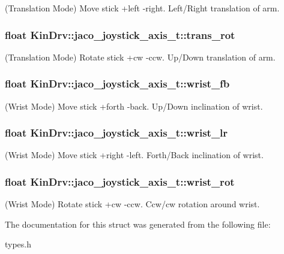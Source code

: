 (Translation Mode) Move stick +left -\/right. Left/\+Right translation of arm. \hypertarget{structKinDrv_1_1jaco__joystick__axis__t_a722bc8f21958cfe9152c105e1c15d7c8}{
\subsubsection[{trans\+\_\+rot}]{\setlength{\rightskip}{0pt plus 5cm}float Kin\+Drv\+::jaco\+\_\+joystick\+\_\+axis\+\_\+t\+::trans\+\_\+rot}}\label{structKinDrv_1_1jaco__joystick__axis__t_a722bc8f21958cfe9152c105e1c15d7c8}
(Translation Mode) Rotate stick +cw -\/ccw. Up/\+Down translation of arm. \hypertarget{structKinDrv_1_1jaco__joystick__axis__t_a7a2b4e7886b584225de0eebcb92451ed}{
\subsubsection[{wrist\+\_\+fb}]{\setlength{\rightskip}{0pt plus 5cm}float Kin\+Drv\+::jaco\+\_\+joystick\+\_\+axis\+\_\+t\+::wrist\+\_\+fb}}\label{structKinDrv_1_1jaco__joystick__axis__t_a7a2b4e7886b584225de0eebcb92451ed}
(Wrist Mode) Move stick +forth -\/back. Up/\+Down inclination of wrist. \hypertarget{structKinDrv_1_1jaco__joystick__axis__t_a7b28e47cfb6709f288990d0439b12f25}{
\subsubsection[{wrist\+\_\+lr}]{\setlength{\rightskip}{0pt plus 5cm}float Kin\+Drv\+::jaco\+\_\+joystick\+\_\+axis\+\_\+t\+::wrist\+\_\+lr}}\label{structKinDrv_1_1jaco__joystick__axis__t_a7b28e47cfb6709f288990d0439b12f25}
(Wrist Mode) Move stick +right -\/left. Forth/\+Back inclination of wrist. \hypertarget{structKinDrv_1_1jaco__joystick__axis__t_a3d24defc5c9edba213a3bfc5f7ec1728}{
\subsubsection[{wrist\+\_\+rot}]{\setlength{\rightskip}{0pt plus 5cm}float Kin\+Drv\+::jaco\+\_\+joystick\+\_\+axis\+\_\+t\+::wrist\+\_\+rot}}\label{structKinDrv_1_1jaco__joystick__axis__t_a3d24defc5c9edba213a3bfc5f7ec1728}
(Wrist Mode) Rotate stick +cw -\/ccw. Ccw/cw rotation around wrist. 

The documentation for this struct was generated from the following file\+:\begin{DoxyCompactItemize}
\item 
types.\+h\end{DoxyCompactItemize}
